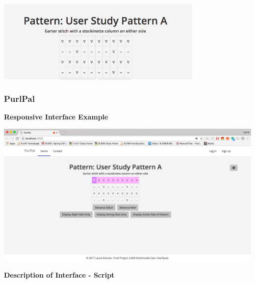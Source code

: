 \documentclass[11pt,twocolumn]{article}
\begin{document}
\includegraphics[width=4in]{nonresponsive_pattern_A}

\clearpage

\subsubsection{PurlPal}

\textbf{Responsive Interface Example} \label{responsive}

\includegraphics[width=6in]{responsive_pattern_A}

\medskip

\qquad \textbf{Description of Interface - Script} \label{script}

\medskip
\end{document}
